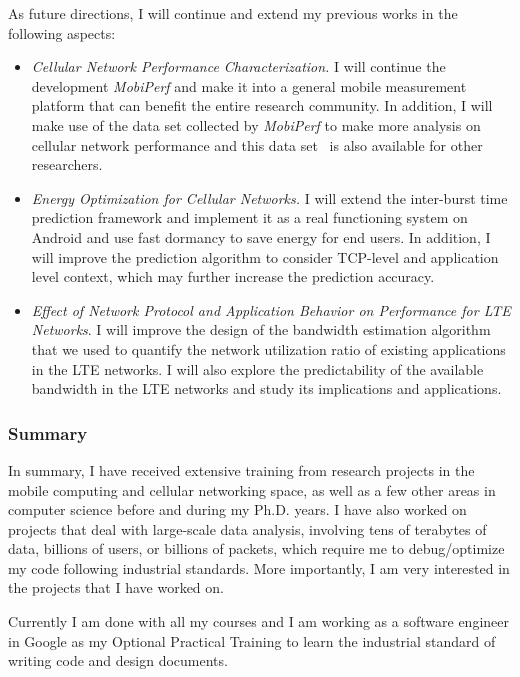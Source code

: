 \documentclass[10pt]{article}
\begin{document}
\begin{small}
As future directions, I will continue and extend my previous works in the following aspects:
\begin{itemize}
\item \emph{Cellular Network Performance Characterization.} I will continue the development \emph{MobiPerf} and make it into a general mobile measurement platform that can benefit the entire research community. In addition, I will make use of the data set collected by \emph{MobiPerf} to make more analysis on cellular network performance and this data set~\cite{mobiperf.data} is also available for other researchers.
\item \emph{Energy Optimization for Cellular Networks.} I will extend the inter-burst time prediction framework and implement it as a real functioning system on Android and use fast dormancy to save energy for end users. In addition, I will improve the prediction algorithm to consider TCP-level and application level context, which may further increase the prediction accuracy.
\item \emph{Effect of Network Protocol and Application Behavior on Performance for LTE Networks}. I will improve the design of the bandwidth estimation algorithm that we used to quantify the network utilization ratio of existing applications in the LTE networks. I will also explore the predictability of the available bandwidth in the LTE networks and study its implications and applications.
\end{itemize}

\subsubsection*{Summary} In summary, I have received extensive training from research projects in the mobile computing and cellular networking space, as well as a few other areas in computer science before and during my Ph.D. years. I have also worked on projects that deal with large-scale data analysis, involving tens of terabytes of data, billions of users, or billions of packets, which require me to debug/optimize my code following industrial standards. More importantly, I am very interested in the projects that I have worked on.

Currently I am done with all my courses and I am working as a software engineer in Google as my Optional Practical Training to learn the industrial standard of writing code and design documents.


\end{small}

\begin{small}


\end{small}
\end{document}
